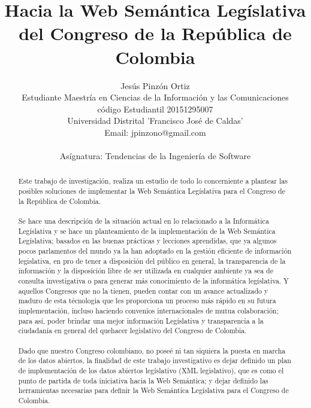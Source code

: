 \documentclass[conference]{IEEEtran}
\begin{document}
\title{Hacia la Web Semántica Legíslativa del Congreso de la República de Colombia}


\author{Jesús Pinzón Ortiz\\
	Estudiante Maestría en Ciencias de la Información y las Comunicaciones\\
código Estudiantil 20151295007\\
Universidad Distrital 'Francisco José de Caldas'\\
Email: jpinzono@gmail.com\\ \\
Asígnatura: Tendencias de la Ingeniería de Software}


\maketitle

\begin{abstract}
	Este trabajo de investigación, realiza un estudio de todo lo concerniente a plantear las posibles soluciones de implementar la Web Semántica Legíslativa para el Congreso de la República de Colombia. \\ \\
	Se hace una descripción de la situación actual en lo relacionado a la Informática Legíslativa y se hace un planteamiento de la implementación de la Web Semántica Legíslativa; basados en las buenas prácticas y lecciones aprendidas, que ya algunos pocos parlamentos del mundo ya la han adoptado en la gestión eficiente de información legislativa, en pro de tener a disposición del público en general, la transparencia de la información y la disposición libre de ser utilizada en cualquier ambiente ya sea de consulta investigativa o para generar más conocimiento de la informática legíslativa.  Y aquellos Congresos que no la tienen, pueden contar con un avance actualizado y maduro de esta técnologia que les proporciona un proceso más rápido en su futura implementación, incluso haciendo convenios internacionales de mutua colaboración; para así, poder brindar una mejor información Legíslativa y transparencia a la ciudadanía en general del quehacer legislativo del Congreso de Colombia. \\ \\
	Dado que nuestro Congreso colombiano, no poseé ni tan siquiera la puesta en marcha de los datos abiertos, la finalidad de este trabajo investigativo es dejar definido un plan de implementación de los datos abiertos legíslativo (XML legislativo), que es como el punto de partida de toda iniciativa hacia la Web Semántica; y dejar definido las herramientas necesarias para definir la Web Semántica Legíslativa para el Congreso de Colombia.
\end{abstract}
\end{document}
